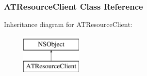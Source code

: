 \hypertarget{interface_a_t_resource_client}{
\subsubsection{ATResourceClient Class Reference}
\label{interface_a_t_resource_client}
}
Inheritance diagram for ATResourceClient:\begin{figure}[h]
\begin{center}
\leavevmode
\includegraphics[height=2.000000cm]{interface_a_t_resource_client}
\end{center}
\end{figure}
